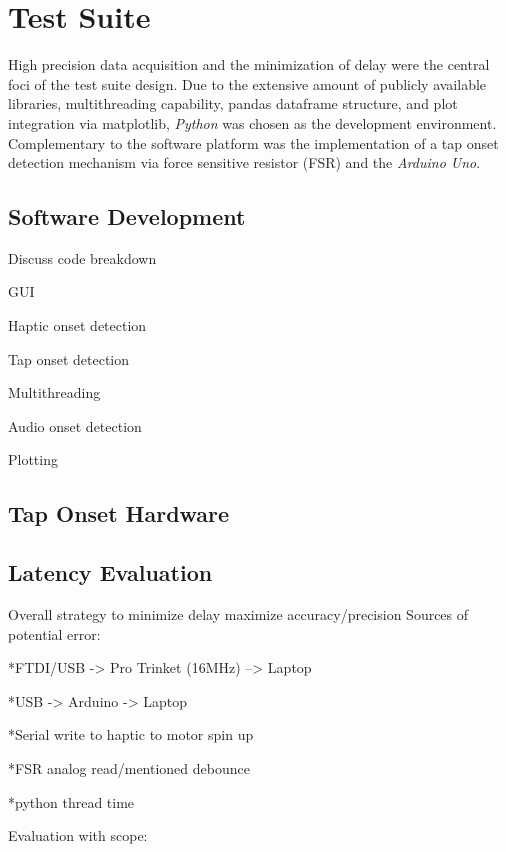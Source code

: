 \section{Test Suite}
High precision data acquisition and the minimization of delay were the central foci of the test suite design. Due to the extensive amount of publicly available libraries, multithreading capability, pandas dataframe structure, and plot integration via matplotlib, \textit{Python} was chosen as the development environment. Complementary to the software platform was the implementation of a tap onset detection mechanism via force sensitive resistor (FSR) and the \textit{Arduino Uno}. 

\subsection{Software Development} \label{development}
            Discuss code breakdown
            
            GUI
            
            Haptic onset detection
            
            Tap onset detection
            
            Multithreading
            
            Audio onset detection
            
            Plotting

\subsection{Tap Onset Hardware}    \label{tap_arduino}

\subsection{Latency Evaluation} \label{latencyCalc}
Overall strategy to minimize delay maximize accuracy/precision
Sources of potential error:

    *FTDI/USB -> Pro Trinket (16MHz) --> Laptop

    *USB -> Arduino -> Laptop

    *Serial write to haptic to motor spin up

    *FSR analog read/mentioned debounce

    *python thread time

    Evaluation with scope:

